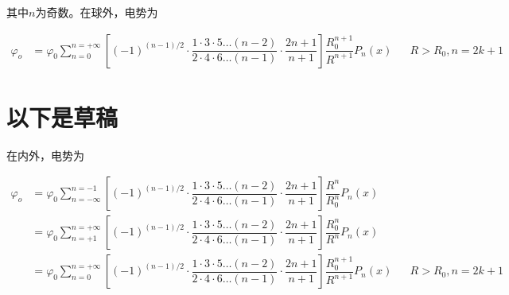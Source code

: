 \documentclass{article}
\begin{document}
其中$n$为奇数。在球外，电势为

\begin{equation*}
  \begin{aligned}
    \varphi_o &=
    \varphi_0 \sum_{n=0}^{n=+\infty}  \left[ \left( -1  \right)^{\left( n-1 \right)/ 2} \cdot \dfrac{1 \cdot 3 \cdot 5 \dots \left( n-2 \right)}{2 \cdot 4 \cdot 6 \dots \left( n-1 \right)} \cdot \dfrac{2n+1}{n+1} \right] \dfrac{R_0^{n+1} }{R^{n+1}} P_n \left( x \right) && R>R_0,n=2k+1
  \end{aligned}
\end{equation*}

\section{以下是草稿}

在内外，电势为

\begin{equation*}
  \begin{aligned}
    \varphi_o &=
    \varphi_0 \sum_{n=- \infty}^{n=-1}  \left[ \left( -1  \right)^{\left( n-1 \right)/ 2} \cdot \dfrac{1 \cdot 3 \cdot 5 \dots \left( n-2 \right)}{2 \cdot 4 \cdot 6 \dots \left( n-1 \right)} \cdot \dfrac{2n+1}{n+1} \right] \dfrac{R^n }{R_0^n} P_n \left( x \right) \\
    &= \varphi_0 \sum_{n=+1}^{n=+ \infty}  \left[ \left( -1  \right)^{\left( n-1 \right)/ 2} \cdot \dfrac{1 \cdot 3 \cdot 5 \dots \left( n-2 \right)}{2 \cdot 4 \cdot 6 \dots \left( n-1 \right)} \cdot \dfrac{2n+1}{n+1} \right] \dfrac{R_0^n }{R^n} P_n \left( x \right) \\
    &= \varphi_0 \sum_{n=0}^{n=+ \infty}  \left[ \left( -1  \right)^{\left( n-1 \right)/ 2} \cdot \dfrac{1 \cdot 3 \cdot 5 \dots \left( n-2 \right)}{2 \cdot 4 \cdot 6 \dots \left( n-1 \right)} \cdot \dfrac{2n+1}{n+1} \right] \dfrac{R_0^{n+1} }{R^{n+1}} P_n \left( x \right) && R>R_0,n=2k+1
  \end{aligned}
\end{equation*}
\end{document}
